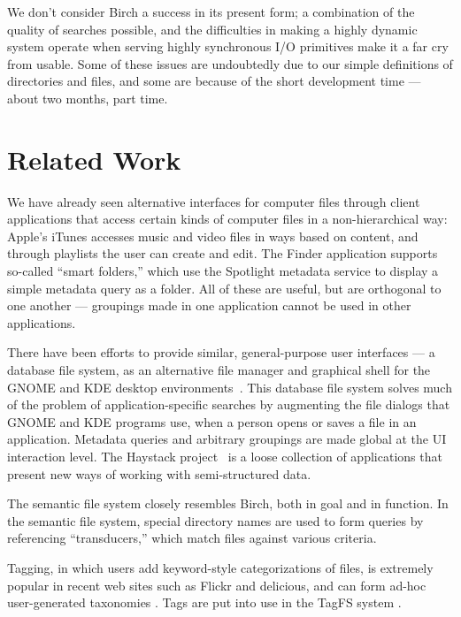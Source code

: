 \documentclass{article}
\begin{document}
We don't consider Birch a success in its present form; a combination
of the quality of searches possible, and the difficulties in making a
highly dynamic system operate when serving highly synchronous I/O
primitives make it a far cry from usable. Some of these issues are
undoubtedly due to our simple definitions of directories and files,
and some are because of the short development time --- about two
months, part time.


\section{Related Work}

We have already seen alternative interfaces for computer files through
client applications that access certain kinds of computer files in a
non-hierarchical way: Apple's iTunes accesses music and video files in
ways based on content, and through playlists the user can create and
edit. The Finder application supports so-called ``smart folders,''
which use the Spotlight metadata service to display a simple
metadata query as a folder. All of these are useful, but are
orthogonal to one another --- groupings made in one application cannot
be used in other applications.

There have been efforts to provide similar, general-purpose user
interfaces --- a database file system, as an alternative file manager
and graphical shell for the GNOME and KDE desktop
environments~\cite{Gorter:2004}. This database file system solves much
of the problem of application-specific searches by augmenting the file
dialogs that GNOME and KDE programs use, when a person opens or saves
a file in an application. Metadata queries and arbitrary groupings are
made global at the UI interaction level. The Haystack
project~\cite{Karger:2003} is a loose collection of applications that
present new ways of working with semi-structured data.

The semantic file system \cite{Gifford:1991} closely resembles Birch,
both in goal and in function. In the semantic file system, special
directory names are used to form queries by referencing
``transducers,'' which match files against various criteria.

Tagging, in which users add keyword-style categorizations of files, is
extremely popular in recent web sites such as Flickr and delicious,
and can form ad-hoc user-generated taxonomies \cite{Mathes:2004}. Tags
are put into use in the TagFS system \cite{Bloehdorn:2006}.
\end{document}
